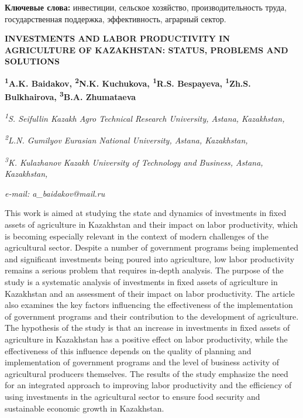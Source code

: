 {\bfseries Ключевые слова:} инвестиции, сельское хозяйство,
производительность труда, государственная поддержка, эффективность,
аграрный сектор.

\begin{articleheader}
{\bfseries INVESTMENTS AND LABOR PRODUCTIVITY IN AGRICULTURE OF KAZAKHSTAN: STATUS, PROBLEMS AND SOLUTIONS}

{\bfseries
\textsuperscript{1}A.K. Baidakov\textsuperscript{\envelope },
\textsuperscript{2}N.K. Kuchukova,
\textsuperscript{1}R.S. Bespayeva,
\textsuperscript{1}Zh.S. Bulkhairova,
\textsuperscript{3}B.A. Zhumataeva}
\end{articleheader}

\begin{affiliation}
\emph{\textsuperscript{1}S. Seifullin Kazakh Agro Technical Research University, Astana, Kazakhstan,}

\emph{\textsuperscript{2}L.N. Gumilyov Eurasian National University, Astana, Kazakhstan,}

\emph{\textsuperscript{3}K. Kulazhanov Kazakh University of Technology and Business, Astana, Kazakhstan,}

\emph{e-mail: a\_baidakov@mail.ru}
\end{affiliation}

This work is aimed at studying the state and dynamics of investments in
fixed assets of agriculture in Kazakhstan and their impact on labor
productivity, which is becoming especially relevant in the context of
modern challenges of the agricultural sector. Despite a number of
government programs being implemented and significant investments being
poured into agriculture, low labor productivity remains a serious
problem that requires in-depth analysis. The purpose of the study is a
systematic analysis of investments in fixed assets of agriculture in
Kazakhstan and an assessment of their impact on labor productivity. The
article also examines the key factors influencing the effectiveness of
the implementation of government programs and their contribution to the
development of agriculture. The hypothesis of the study is that an
increase in investments in fixed assets of agriculture in Kazakhstan has
a positive effect on labor productivity, while the effectiveness of this
influence depends on the quality of planning and implementation of
government programs and the level of business activity of agricultural
producers themselves. The results of the study emphasize the need for an
integrated approach to improving labor productivity and the efficiency
of using investments in the agricultural sector to ensure food security
and sustainable economic growth in Kazakhstan.

